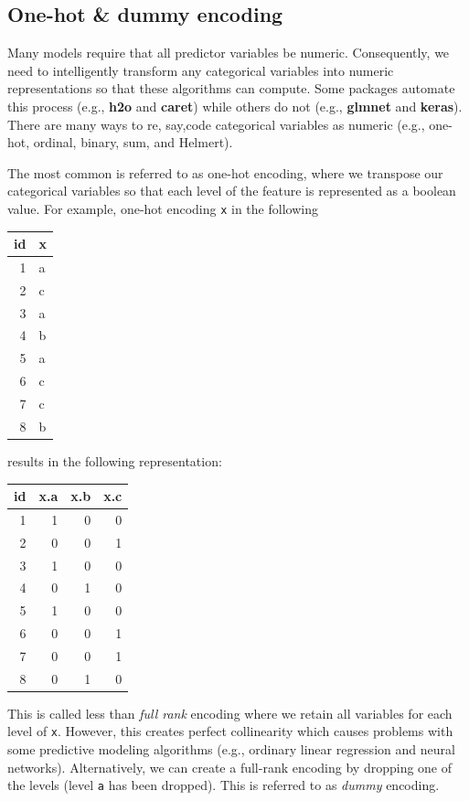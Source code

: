 \documentclass[]{krantz}
\begin{document}
\hypertarget{one-hot-dummy-encoding}{%
\subsection{One-hot \& dummy encoding}\label{one-hot-dummy-encoding}}

Many models require that all predictor variables be numeric. Consequently, we need to intelligently transform any categorical variables into numeric representations so that these algorithms can compute. Some packages automate this process (e.g., \textbf{h2o} and \textbf{caret}) while others do not (e.g., \textbf{glmnet} and \textbf{keras}). There are many ways to re, say,code categorical variables as numeric (e.g., one-hot, ordinal, binary, sum, and Helmert).

The most common is referred to as one-hot encoding, where we transpose our categorical variables so that each level of the feature is represented as a boolean value. For example, one-hot encoding \texttt{x} in the following

\begin{tabular}{r|l}
\hline
id & x\\
\hline
1 & a\\
\hline
2 & c\\
\hline
3 & a\\
\hline
4 & b\\
\hline
5 & a\\
\hline
6 & c\\
\hline
7 & c\\
\hline
8 & b\\
\hline
\end{tabular}

results in the following representation:

\begin{tabular}{r|r|r|r}
\hline
id & x.a & x.b & x.c\\
\hline
1 & 1 & 0 & 0\\
\hline
2 & 0 & 0 & 1\\
\hline
3 & 1 & 0 & 0\\
\hline
4 & 0 & 1 & 0\\
\hline
5 & 1 & 0 & 0\\
\hline
6 & 0 & 0 & 1\\
\hline
7 & 0 & 0 & 1\\
\hline
8 & 0 & 1 & 0\\
\hline
\end{tabular}

This is called less than \emph{full rank} encoding where we retain all variables for each level of \texttt{x}. However, this creates perfect collinearity which causes problems with some predictive modeling algorithms (e.g., ordinary linear regression and neural networks). Alternatively, we can create a full-rank encoding by dropping one of the levels (level \texttt{a} has been dropped). This is referred to as \emph{dummy} encoding.
\end{document}
